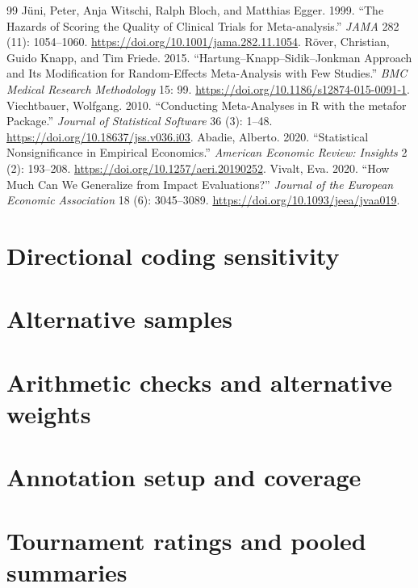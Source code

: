 \documentclass[11pt]{article}
\begin{document}
\begin{thebibliography}{99}
 J\"uni, Peter, Anja Witschi, Ralph Bloch, and Matthias Egger. 1999. ``The Hazards of Scoring the Quality of Clinical Trials for Meta-analysis.'' \textit{JAMA} 282 (11): 1054--1060. \url{https://doi.org/10.1001/jama.282.11.1054}.
 R\"over, Christian, Guido Knapp, and Tim Friede. 2015. ``Hartung--Knapp--Sidik--Jonkman Approach and Its Modification for Random-Effects Meta-Analysis with Few Studies.'' \textit{BMC Medical Research Methodology} 15: 99. \url{https://doi.org/10.1186/s12874-015-0091-1}.
 Viechtbauer, Wolfgang. 2010. ``Conducting Meta-Analyses in R with the metafor Package.'' \textit{Journal of Statistical Software} 36 (3): 1--48. \url{https://doi.org/10.18637/jss.v036.i03}.
 Abadie, Alberto. 2020. ``Statistical Nonsignificance in Empirical Economics.'' \textit{American Economic Review: Insights} 2 (2): 193--208. \url{https://doi.org/10.1257/aeri.20190252}.
 Vivalt, Eva. 2020. ``How Much Can We Generalize from Impact Evaluations?'' \textit{Journal of the European Economic Association} 18 (6): 3045--3089. \url{https://doi.org/10.1093/jeea/jvaa019}.
\end{thebibliography}

\clearpage\appendix
\setcounter{table}{0}
\section{Directional coding sensitivity}

\clearpage
\section{Alternative samples}

\clearpage
\section{Arithmetic checks and alternative weights}


\clearpage
\section{Annotation setup and coverage}

\clearpage
\section{Tournament ratings and pooled summaries}


\end{document}
